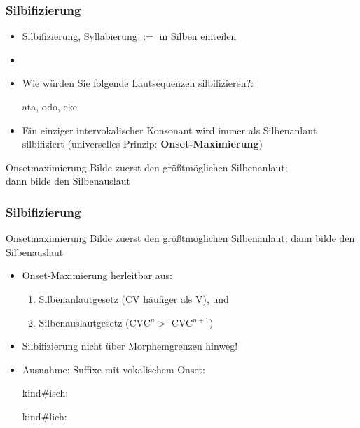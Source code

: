 \begin{frame}
\frametitle{Silbifizierung}

\begin{itemize}
	\item Silbifizierung, Syllabierung $:=$ in Silben einteilen
	\item[]
	\item Wie würden Sie folgende Lautsequenzen silbifizieren?:

	  \ea
          ata, odo, eke
          \z

\pause

	\item Ein einziger intervokalischer Konsonant wird immer als Silbenanlaut silbifiziert (universelles Prinzip: \textbf{Onset-Maximierung})
	
	
\end{itemize}

\begin{block}{Onsetmaximierung}
Bilde zuerst den größtmöglichen Silbenanlaut;\\ dann bilde den Silbenauslaut \citep[218]{Hall00a}
\end{block}

\end{frame}




\begin{frame}
\frametitle{Silbifizierung}

\begin{block}{Onsetmaximierung}
Bilde zuerst den größtmöglichen Silbenanlaut; dann bilde den Silbenauslaut \citep[218]{Hall00a}
\end{block}


\begin{itemize}
	\item Onset-Maximierung herleitbar aus:
	\begin{enumerate}
		\item Silbenanlautgesetz (CV häufiger als V), und
		\item Silbenauslautgesetz (CVC$^{n} >$ CVC$^{n+1}$)
	\end{enumerate}

\pause
	\item Silbifizierung nicht über Morphemgrenzen hinweg! 
	\item Ausnahme: Suffixe mit vokalischem Onset:
	
	  \ea
          kind\#isch: 
          \z
	
	  \ea
          kind\#lich: \textipa{[kInt.lI\c{c}]}
          \z
	
\end{itemize}

\end{frame}


